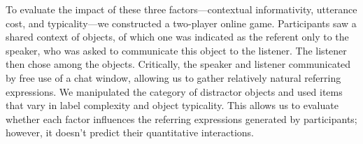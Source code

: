 \documentclass[10pt,letterpaper]{article}
\begin{document}

To evaluate the impact of these three factors---contextual informativity, utterance cost, and typicality---we constructed a two-player online game. Participants saw a shared context of objects, of which one was indicated as the referent only to the speaker, who was asked to communicate this object to the listener. The listener then chose among the objects. Critically, the speaker and listener communicated by free use of a chat window, allowing us to gather relatively natural referring expressions. We manipulated the category of distractor objects and used items that vary in label complexity and object typicality. This allows us to evaluate whether each factor influences the referring expressions generated by participants; however, it doesn't predict their quantitative interactions.

\end{document}
